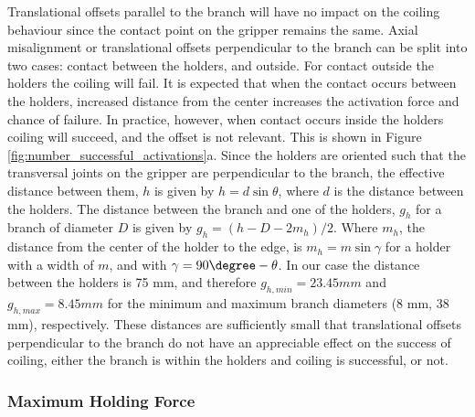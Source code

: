 Translational offsets parallel to the branch will have no impact on the coiling behaviour since the contact point on the gripper remains the same. Axial misalignment or translational offsets perpendicular to the branch can be split into two cases: contact between the holders, and outside. For contact outside the holders the coiling will fail. It is expected that when the contact occurs between the holders, increased distance from the center increases the activation force and chance of failure. In practice, however, when contact occurs inside the holders coiling will succeed, and the offset is not relevant. This is shown in Figure \mbox{\ref{fig:number_successful_activations}a}. Since the holders are oriented such that the transversal joints on the gripper are perpendicular to the branch, the effective distance between them, $h$ is given by $h=d \sin \theta$, where $d$ is the distance between the holders. The distance between the branch and one of the holders, $g_h$ for a branch of diameter $D$ is given by $g_h = (h-D-2m_h)/2$. Where $m_h$, the distance from the center of the holder to the edge, is $m_h = m \sin \gamma$ for a holder with a width of $m$, and with $\gamma= 90\degree - \theta$. In our case the distance between the holders is 75 mm, and therefore $g_{h, min}=23.45 mm$ and $g_{h, max}=8.45mm$ for the minimum and maximum branch diameters (8 mm, 38 mm), respectively. These distances are sufficiently small that translational offsets perpendicular to the branch do not have an appreciable effect on the success of coiling, either the branch is within the holders and coiling is successful, or not.


\subsubsection{Maximum Holding Force}

